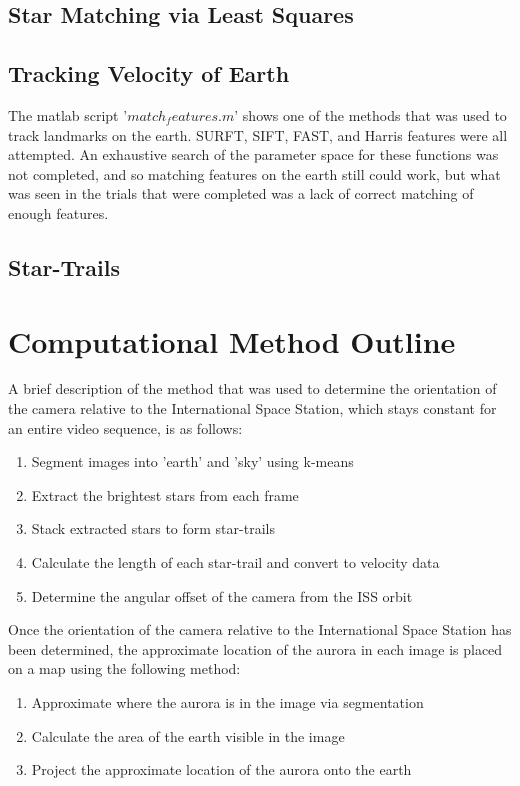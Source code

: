 \documentclass[12pt]{article}
\theoremstyle{definition}
\begin{document}
\subsection{ \bf Star Matching via Least Squares }


\subsection{ \bf Tracking Velocity of Earth }

The matlab script '$match_features.m$' shows one of the methods that was used to track landmarks on the earth.  SURFT, SIFT, FAST, and Harris features were all attempted.  An exhaustive search of the parameter space for these functions was not completed, and so matching features on the earth still could work, but what was seen in the trials that were completed was a lack of correct matching of enough features.  

\subsection{ \bf Star-Trails }


\section{\bf Computational Method Outline }

A brief description of the method that was used to determine the orientation of the camera relative to the International Space Station, which stays constant for an entire video sequence, is as follows:
\begin{enumerate}
\item Segment images into 'earth' and 'sky' using k-means
\item Extract the brightest stars from each frame
\item Stack extracted stars to form star-trails
\item Calculate the length of each star-trail and convert to velocity data
\item Determine the angular offset of the camera from the ISS orbit
\end{enumerate}

Once the orientation of the camera relative to the International Space Station has been determined, the approximate location of the aurora in each image is placed on a map using the following method:
\begin{enumerate}
\item Approximate where the aurora is in the image via segmentation
\item Calculate the area of the earth visible in the image
\item Project the approximate location of the aurora onto the earth
\end{enumerate}
\end{document}

